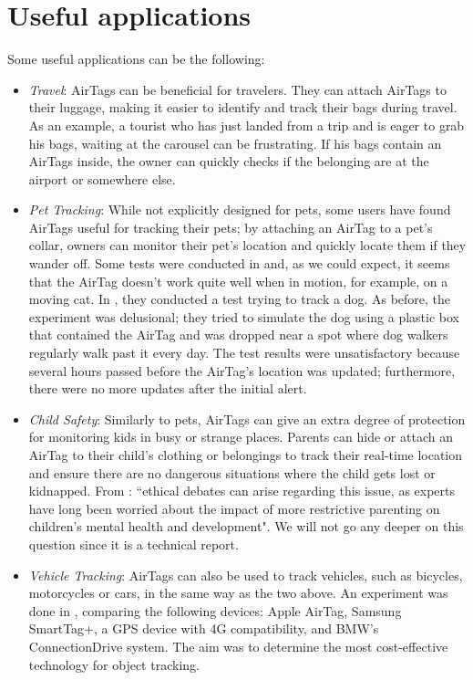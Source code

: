 \documentclass[english]{article}
\begin{document}
\section{Useful applications}\label{appl}
Some useful applications can be the following:
\begin{itemize}
  \item \textit{Travel}: AirTags can be beneficial for travelers. They can attach AirTags to their luggage, making it easier to identify and track their bags during travel. As an example, a tourist who has just landed from a trip and is eager to grab his bags, waiting at the carousel can be frustrating. If his bags contain an AirTags inside, the owner can quickly checks if the belonging are at the airport or somewhere else. 
  \item \textit{Pet Tracking}: While not explicitly designed for pets, some users have found AirTags useful for tracking their pets; by attaching an AirTag to a pet's collar, owners can monitor their pet's location and quickly locate them if they wander off. Some tests were conducted in \cite{KittyCatGO2024} and, as we could expect, it seems that the AirTag doesn’t work quite well when in motion, for example, on a moving cat. In \cite{Src2024}, they conducted a test trying to track a dog. As before, the experiment was delusional; they tried to simulate the dog using a plastic box that contained the AirTag and was dropped near a spot where dog walkers regularly walk past it every day. 
  The test results were unsatisfactory because several hours passed before the AirTag's location was updated; furthermore, there were no more updates after the initial alert.
  \item \textit{Child Safety}: Similarly to pets, AirTags can give an extra degree of protection for monitoring kids in busy or strange places. Parents can hide or attach an AirTag to their child's clothing or belongings to track their real-time location and ensure there are no dangerous situations where the child gets lost or kidnapped. From \cite{Kelly_2023}: ``ethical debates can arise regarding this issue, as experts have long been worried about the impact of more restrictive parenting on children’s mental health and development". We will not go any deeper on this question since it is a technical report.
  \item \textit{Vehicle Tracking}: AirTags can also be used to track vehicles, such as bicycles, motorcycles or cars, in the same way as the two above. An experiment was done in \cite{Maric2023}, comparing the following devices: Apple AirTag, Samsung SmartTag+, a GPS device with 4G compatibility, and BMW's ConnectionDrive system. The aim was to determine the most cost-effective technology for object tracking.

\end{itemize}
\end{document}
